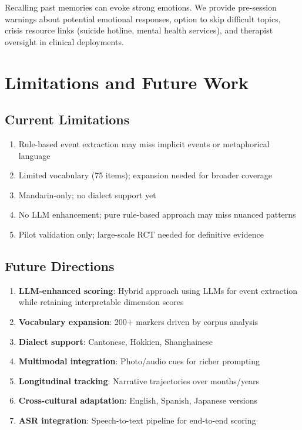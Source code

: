 \documentclass[11pt]{article}
\begin{document}
Recalling past memories can evoke strong emotions. We provide pre-session warnings about potential emotional responses, option to skip difficult topics, crisis resource links (suicide hotline, mental health services), and therapist oversight in clinical deployments.


\section{Limitations and Future Work}

\subsection{Current Limitations}

\begin{enumerate}[label=(\arabic*)]
    \item Rule-based event extraction may miss implicit events or metaphorical language
    \item Limited vocabulary (75 items); expansion needed for broader coverage
    \item Mandarin-only; no dialect support yet
    \item No LLM enhancement; pure rule-based approach may miss nuanced patterns
    \item Pilot validation only; large-scale RCT needed for definitive evidence
\end{enumerate}

\subsection{Future Directions}

\begin{enumerate}[label=(\arabic*)]
    \item \textbf{LLM-enhanced scoring}: Hybrid approach using LLMs for event extraction while retaining interpretable dimension scores
    \item \textbf{Vocabulary expansion}: 200+ markers driven by corpus analysis
    \item \textbf{Dialect support}: Cantonese, Hokkien, Shanghainese
    \item \textbf{Multimodal integration}: Photo/audio cues for richer prompting
    \item \textbf{Longitudinal tracking}: Narrative trajectories over months/years
    \item \textbf{Cross-cultural adaptation}: English, Spanish, Japanese versions
    \item \textbf{ASR integration}: Speech-to-text pipeline for end-to-end scoring
\end{enumerate}
\end{document}
